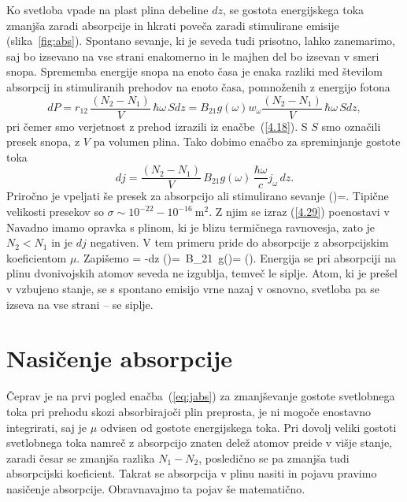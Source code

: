 Ko svetloba vpade na plast plina debeline $dz$, se gostota
energijskega toka zmanjša zaradi absorpcije in hkrati poveča zaradi 
stimulirane emisije (slika~\ref{fig:abs}). 
Spontano sevanje, ki je seveda tudi prisotno, lahko zanemarimo, saj
bo izsevano na vse strani enakomerno in le majhen del bo izsevan v smeri snopa.
Sprememba energije snopa na enoto časa je enaka razliki med 
številom absorpcij in stimuliranih prehodov na enoto časa, pomnoženih z 
energijo fotona
\begin{equation}
dP=r_{12}\,\frac{(N_{2}-N_{1})}{V} \, \hbar\omega \,S dz= 
B_{21}g(\omega) w_{\omega} \frac{(N_{2}-N_{1})}{V}\, \hbar\omega \,S dz,
\label{4.28}
\end{equation}
pri čemer smo verjetnost z prehod izrazili iz enačbe~(\ref{4.18}).
S $S$ smo označili presek snopa, z $V$ pa volumen plina. Tako dobimo 
enačbo za spreminjanje gostote toka 
\begin{equation}
dj=\frac{(N_{2}-N_{1})}{V}\, B_{21}g(\omega)\, \frac{\hbar\omega}{c}j_{\omega}\, dz.
\label{4.29}
\end{equation}
Priročno je vpeljati še presek za absorpcijo ali
stimulirano sevanje 
\beq
\sigma(\omega)=.
\label{sigma}
\eeq
Tipične velikosti presekov so $\sigma \sim 10^{-22}-10^{-16}~\si{\metre^2}$. 
Z njim se izraz (\ref{4.29}) poenostavi v 
Navadno imamo opravka s plinom, ki je blizu termičnega ravnovesja,
zato je $N_{2}<N_{1}$ in je $dj$ negativen. V tem primeru pride do
absorpcije z absorpcijskim koeficientom
$\mu$. Zapišemo 
\beq
{} = -\mu dz \qquad {} \qquad 
\mu(\omega)=\, B_{21}\, g(\omega)=
\sigma(\omega).
\label{eq:jabs}
\eeq
Energija se pri absorpciji na plinu dvonivojskih atomov seveda
ne izgublja, temveč le siplje. Atom, ki je prešel v vzbujeno stanje,
se s spontano emisijo vrne nazaj v osnovno, svetloba pa se izseva
na vse strani -- se siplje.

\section{Nasičenje absorpcije}
\label{chap:NasAbs}
Čeprav je na prvi pogled enačba~(\ref{eq:jabs}) za zmanjševanje 
gostote svetlobnega toka pri prehodu skozi absorbirajoči plin preprosta,
je ni mogoče enostavno integrirati, saj je $\mu$ odvisen od 
gostote energijskega toka. Pri dovolj veliki gostoti
svetlobnega toka namreč z absorpcijo znaten delež
atomov preide v višje stanje, zaradi česar se zmanjša razlika $N_{1}-N_{2}$,
posledično se pa zmanjša tudi absorpcijski koeficient. Takrat se absorpcija
v plinu nasiti in pojavu pravimo nasičenje absorpcije.
Obravnavajmo ta pojav še matematično.

